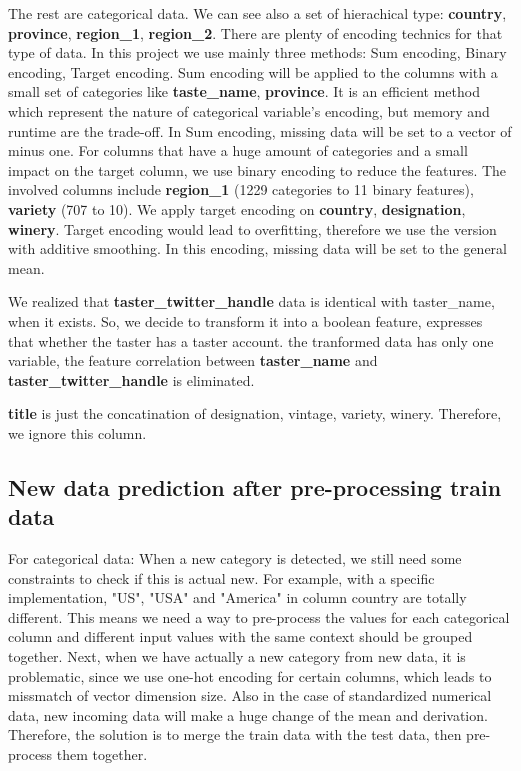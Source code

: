 \documentclass[11pt]{article}
\begin{document}
The rest are categorical data. We can see also a set of hierachical type: \textbf{country}, \textbf{province}, \textbf{region\_1}, \textbf{region\_2}. There are plenty of encoding technics for that type of data. In this project we use mainly three methods: Sum encoding, Binary encoding, Target encoding. Sum encoding will be applied to the columns with a small set of categories like \textbf{taste\_name}, \textbf{province}. It is an efficient method which represent the nature of categorical variable's encoding, but memory and runtime are the trade-off. In Sum encoding, missing data will be set to a vector of minus one. For columns that have a huge amount of categories and a small impact on the target column, we use binary encoding to reduce the features. The involved columns include \textbf{region\_1} (1229 categories to 11 binary features), \textbf{variety} (707 to 10). We apply target encoding on \textbf{country}, \textbf{designation}, \textbf{winery}. Target encoding would lead to overfitting, therefore we use the version with additive smoothing. In this encoding, missing data will be set to the general mean.

We realized that \textbf{taster\_twitter\_handle} data is identical with taster\_name, when it exists. So, we decide to transform it into a boolean feature, expresses that whether the taster has a taster account. the tranformed data has only one variable, the feature correlation between \textbf{taster\_name} and \textbf{taster\_twitter\_handle} is eliminated.

\textbf{title} is just the concatination of designation, vintage, variety, winery. Therefore, we ignore this column.

\subsection{New data prediction after pre-processing train data}

For categorical data: When a new category is detected, we still need some constraints to check if this is actual new. For example, with a specific implementation, "US", "USA" and "America" in column country are totally different. This means we need a way to pre-process the values for each categorical column and different input values with the same context should be grouped together. Next, when we have actually a new category from new data, it is problematic, since we use one-hot encoding for certain columns, which leads to missmatch of vector dimension size. Also in the case of standardized numerical data, new incoming data will make a huge change of the mean and derivation. Therefore, the solution is to merge the train data with the test data, then pre-process them together.
\end{document}

